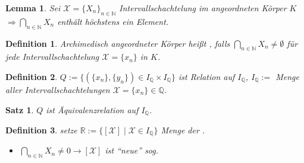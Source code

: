 \documentclass[ngerman,a4paper]{report}
\theoremstyle{break}
\newtheorem{lemma}[theorem]{Lemma}
\newtheorem{satz}[theorem]{Satz}
\newtheorem*{definition}{Definition}
\begin{document}
\begin{lemma}
	Sei $\mathcal{X} = \{X_n\}_{n\in\mathbb{N}}$ Intervallschachtelung im angeordneten Körper $K$\\
	$\Rightarrow \bigcap_{n\in\mathbb{N}} X_n$ enthält höchstens ein Element.
\end{lemma}

\begin{definition}
	Archimedisch angeordneter Körper heißt , falls $\bigcap_{n\in\mathbb{N}} X_n\neq \emptyset$ für jede Intervallschachtelung $\mathcal{X} = \{x_n\}$ in $K$.
\end{definition}

\begin{definition}
	$Q:=\{ (\{x_n\}, \{y_n\})\in I_\mathbb{Q}\times I_\mathbb{Q} \}$ ist Relation auf $I_\mathbb{Q}$, $I_\mathbb{Q}:=$ Menge aller Intervallschachtelungen $\mathcal{X}=\{x_n\} \in \mathbb{Q}$.
\end{definition}

\begin{satz}
	$Q$ ist Äquivalenzrelation auf $I_\mathbb{Q}$.
\end{satz}

\begin{definition}
	setze $\mathbb{R} := \{ [\mathcal{X}] \mid \mathcal{X}\in I_\mathbb{Q} \}$ Menge der .
	
	\begin{itemize}
		\item $\bigcap_{n\in\mathbb{N}} X_n \neq 0 \rightarrow [\mathcal{X}]$ ist "`neue"' sog. 
	\end{itemize}
\end{definition}
\end{document}
